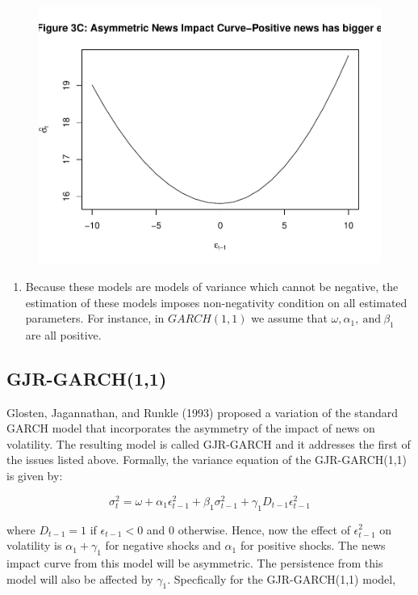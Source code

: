 \documentclass[]{book}
\providecommand{\tightlist}{%
  \setlength{\itemsep}{0pt}\setlength{\parskip}{0pt}}
\theoremstyle{definition}
\theoremstyle{definition}
\theoremstyle{definition}
\theoremstyle{remark}
\begin{document}
\begin{figure}
{\centering \includegraphics[width=1\linewidth]{bookdown-demo_files/figure-latex/ch7-figure2-3} 

}

\end{figure}

\begin{enumerate}
\def\labelenumi{\arabic{enumi}.}
\setcounter{enumi}{1}
\tightlist
\item
  Because these models are models of variance which cannot be negative, the estimation of these models imposes non-negativity condition on all estimated parameters. For instance, in \(GARCH(1,1)\) we assume that \(\omega, \alpha_1, \ \text{and} \ \beta_1\) are all positive.
\end{enumerate}

\hypertarget{gjr-garch11}{%
\subsection{GJR-GARCH(1,1)}\label{gjr-garch11}}

Glosten, Jagannathan, and Runkle (1993) proposed a variation of the standard GARCH model that incorporates the asymmetry of the impact of news on volatility. The resulting model is called GJR-GARCH and it addresses the first of the issues listed above. Formally, the variance equation of the GJR-GARCH(1,1) is given by:

\[ \sigma_t^2=\omega+\alpha_1 \epsilon^2_{t-1}+\beta_1 \sigma^2_{t-1}+\gamma_1 D_{t-1}\epsilon^2_{t-1}\]

where \(D_{t-1}=1\) if \(\epsilon_{t-1}<0\) and \(0\) otherwise. Hence, now the effect of \(\epsilon^2_{t-1}\) on volatility is \(\alpha_1+\gamma_1\) for negative shocks and \(\alpha_1\) for positive shocks. The news impact curve from this model will be asymmetric. The persistence from this model will also be affected by \(\gamma_1\). Specfically for the GJR-GARCH(1,1) model,
\end{document}
